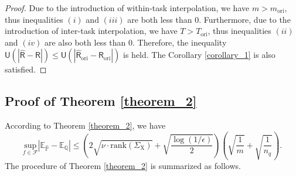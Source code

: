 \begin{proof}
Due to the introduction of within-task interpolation, we have $m > m_\text{ori}$, thus inequalities $(i)$ and $(iii)$ are both less than 0. Furthermore, due to the introduction of inter-task interpolation, we have $T > T_\text{ori}$, thus inequalities $(ii)$ and $(iv)$ are also both less than 0. Therefore, the inequality $\mathsf{U}(|\hat{\mathsf R}-\mathsf R|) \leq \mathsf{U}(|\hat{\mathsf R}_\text{ori}-\mathsf R_\text{ori}|)$ is held. The Corollary \ref{corollary_1} is also satisfied.
\end{proof}

\subsection{Proof of Theorem \ref{theorem_2}}
According to Theorem \ref{theorem_2}, we have
\begin{equation}
    \underset{f\in\mathcal{F}}{\text{sup}}|\mathbb{E}_{\hat{\mathbb P} }-\mathbb E_{\mathbb Q}| \leq \left(2\sqrt{\nu\cdot\text{rank}(\Sigma_{\mathrm{X}})} + \sqrt{\frac{\log(1/\epsilon)}{2}} \right) \left( \sqrt{\frac{1}{m}} + \sqrt{\frac{1}{n_q}} \right).
\end{equation}
The procedure of Theorem \ref{theorem_2} is summarized as follows.
